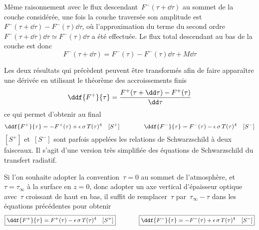 \sk
Même raisonnement avec le flux descendant~$F^-(\tau+\dd\tau)$ au sommet de la couche considérée,
une fois la couche traversée son amplitude est~$F^-(\tau+\dd\tau) - F^-(\tau) \dd\tau$, où 
l'approximation du terme du second ordre~$F^-(\tau+\dd\tau) \dd\tau \simeq F^-(\tau) \dd\tau$
a été effectuée.
Le flux total descendant au bas de la couche est donc
\[
F^-(\tau+\dd\tau) = F^-(\tau) - F^-(\tau) \dd\tau + M\dd\tau
\]

\sk
Les deux résultats qui précèdent peuvent être transformés 
afin de faire apparaître une dérivée
en utilisant le théorème des accroissements finis
\[
\ddf{F^+}{\tau} = \frac{F^+(\tau+\dd\tau) - F^+(\tau)}{\dd\tau}
\]
\noindent ce qui permet d'obtenir au final
\[
\ddf{F^+}{\tau} = - F^+(\tau) + \epsilon\,\sigma\,T(\tau)^4 \quad [S^+]
\qquad\qquad 
\ddf{F^-}{\tau} = F^-(\tau) - \epsilon\,\sigma\,T(\tau)^4 \quad [S^-]
\]
\noindent $[S^+]$ et~$[S^-]$ sont parfois appelées les relations de Schwarzschild à deux faisceaux.
Il s'agit d'une version très simplifiée des équations de Schwarzschild du transfert radiatif.

\sk
Si l'on souhaite adopter la convention~$\tau=0$ au sommet de l'atmosphère,
et $\tau=\tau_{\infty}$ à la surface en $z=0$, donc adopter un axe
vertical d'épaisseur optique avec~$\tau$ croissant de haut en bas, il
suffit de remplacer~$\tau$ par~$\tau_{\infty}-\tau$ dans les équations précédentes pour obtenir
\[
\boxed{\ddf{F^+}{\tau} = F^+(\tau) - \epsilon\,\sigma\,T(\tau)^4 \quad [S^+]} 
\qquad\qquad 
\boxed{\ddf{F^-}{\tau} = -F^-(\tau) + \epsilon\,\sigma\,T(\tau)^4 \quad [S^-]}
\]







